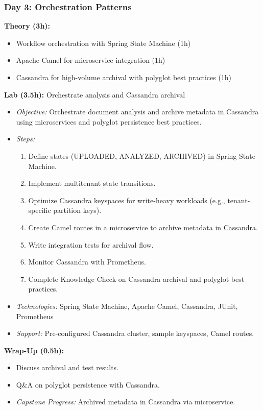 \documentclass[11pt]{article}
\begin{document}
\subsubsection{Day 3: Orchestration Patterns}
\textbf{Theory (3h):}
\begin{itemize}
    \item Workflow orchestration with Spring State Machine (1h)
    \item Apache Camel for microservice integration (1h)
    \item Cassandra for high-volume archival with polyglot best practices (1h)
\end{itemize}
\textbf{Lab (3.5h):} Orchestrate analysis and Cassandra archival
\begin{itemize}
    \item \textit{Objective:} Orchestrate document analysis and archive metadata in Cassandra using microservices and polyglot persistence best practices.
    \item \textit{Steps:}
        \begin{enumerate}
            \item Define states (UPLOADED, ANALYZED, ARCHIVED) in Spring State Machine.
            \item Implement multitenant state transitions.
            \item Optimize Cassandra keyspaces for write-heavy workloads (e.g., tenant-specific partition keys).
            \item Create Camel routes in a microservice to archive metadata in Cassandra.
            \item Write integration tests for archival flow.
            \item Monitor Cassandra with Prometheus.
            \item Complete Knowledge Check on Cassandra archival and polyglot best practices.
        \end{enumerate}
    \item \textit{Technologies:} Spring State Machine, Apache Camel, Cassandra, JUnit, Prometheus
    \item \textit{Support:} Pre-configured Cassandra cluster, sample keyspaces, Camel routes.
\end{itemize}
\textbf{Wrap-Up (0.5h):}
\begin{itemize}
    \item Discuss archival and test results.
    \item Q\&A on polyglot persistence with Cassandra.
    \item \textit{Capstone Progress:} Archived metadata in Cassandra via microservice.
\end{itemize}
\end{document}
